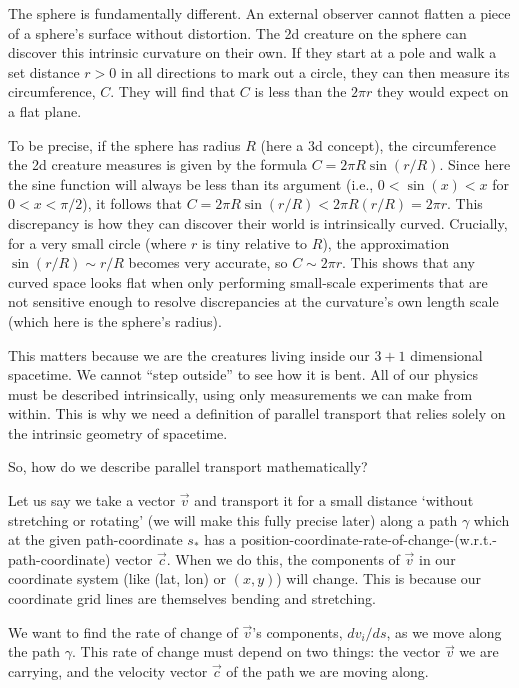 \documentclass[twocolumn]{article}
\begin{document}
The sphere is fundamentally different. An external observer cannot
flatten a piece of a sphere's surface without distortion. The 2d
creature on the sphere can discover this intrinsic curvature on their
own. If they start at a pole and walk a set distance \(r>0\) in all
directions to mark out a circle, they can then measure its
circumference, \(C\). They will find that \(C\) is less than the
\(2\pi r\) they would expect on a flat plane.

To be precise, if the sphere has radius \(R\) (here a 3d
concept), the circumference the 2d creature measures is given by the
formula $C=2\pi R\sin(r/R)$. Since here the sine function will always
be less than its argument (i.e., \(0<\sin(x)<x\) for $0<x<\pi/2$),
it follows that \(C=2\pi R\sin(r/R) < 2\pi R(r/R)=2\pi r\).
This discrepancy is how they can discover their world is intrinsically curved.
Crucially, for a very small circle (where \(r\) is tiny relative to $R$), the
approximation \(\sin(r/R)\sim r/R\) becomes very accurate, so \(C\sim
2\pi r\). This shows that any curved space looks flat when only
performing small-scale experiments that are not sensitive enough
to resolve discrepancies at the curvature's own length scale
(which here is the sphere's radius).

This matters because we are the creatures living inside our \(3+1\)
dimensional spacetime. We cannot ``step outside'' to see how it is bent.
All of our physics must be described intrinsically, using only
measurements we can make from within. This is why we need a definition
of parallel transport that relies solely on the intrinsic geometry of
spacetime.

So, how do we describe parallel transport mathematically?

Let us say we take a vector \(\vec{v}\) and transport it for a small
distance `without stretching or rotating' (we will make this fully
precise later) along a path \(\gamma\) which at the given
path-coordinate $s_*$ has a
position-coordinate-rate-of-change-(w.r.t.-path-coordinate) vector
\(\vec{c}\). When we do this, the components of \(\vec{v}\) in our
coordinate system (like (lat, lon) or \((x, y)\)) will change. This is
because our coordinate grid lines are themselves bending and
stretching.

We want to find the rate of change of \(\vec{v}\)'s components,
\(dv_i/ds\), as we move along the path \(\gamma\). This rate of change
must depend on two things: the vector \(\vec{v}\) we are carrying, and
the velocity vector \(\vec{c}\) of the path we are moving along.
\end{document}
